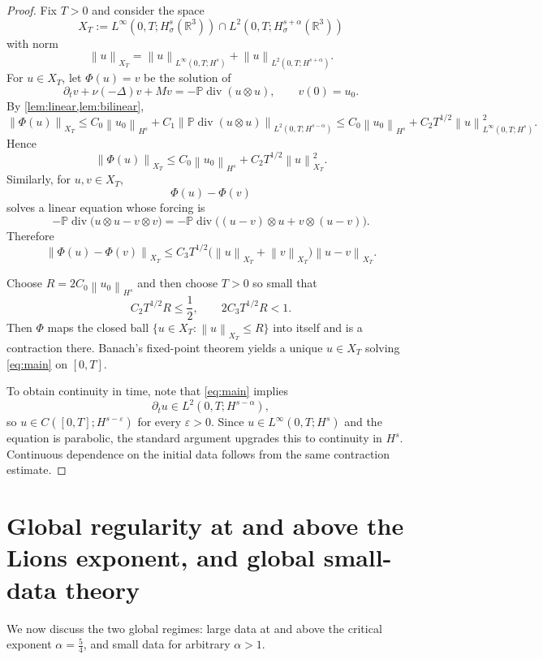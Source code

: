 \documentclass[11pt]{article}
\theoremstyle{definition}
\theoremstyle{remark}
\newcommand{\R}{\mathbb{R}}
\newcommand{\Pcal}{\mathbb{P}}
\newcommand{\norm}[1]{\left\lVert #1\right\rVert}
\newcommand{\diver}{\operatorname{div}}
\begin{document}
\begin{proof}
Fix $T>0$ and consider the space
\[
X_T
:=
L^\infty(0,T;H^s_\sigma(\R^3))
\cap
L^2(0,T;H^{s+\alpha}_\sigma(\R^3))
\]
with norm
\[
\norm{u}_{X_T}
=
\norm{u}_{L^\infty(0,T;H^s)}
+
\norm{u}_{L^2(0,T;H^{s+\alpha})}.
\]
For $u\in X_T$, let $\Phi(u)=v$ be the solution of
\begin{equation}\label{eq:fixedpoint}
\partial_t v + \nu(-\Delta)v + M v = -\Pcal\diver(u\otimes u),
\qquad
v(0)=u_0.
\end{equation}
By \cref{lem:linear,lem:bilinear},
\[
\norm{\Phi(u)}_{X_T}
\le
C_0 \norm{u_0}_{H^s}
+
C_1 \norm{\Pcal\diver(u\otimes u)}_{L^2(0,T;H^{s-\alpha})}
\le
C_0 \norm{u_0}_{H^s}
+
C_2 T^{1/2}\norm{u}_{L^\infty(0,T;H^s)}^2.
\]
Hence
\begin{equation}\label{eq:mapping-est}
\norm{\Phi(u)}_{X_T}
\le
C_0 \norm{u_0}_{H^s}
+
C_2 T^{1/2}\norm{u}_{X_T}^2.
\end{equation}
Similarly, for $u,v\in X_T$,
\[
\Phi(u)-\Phi(v)
\]
solves a linear equation whose forcing is
\[
-\Pcal \diver \bigl( u\otimes u - v\otimes v\bigr)
=
-\Pcal \diver \bigl((u-v)\otimes u + v\otimes (u-v)\bigr).
\]
Therefore
\[
\norm{\Phi(u)-\Phi(v)}_{X_T}
\le
C_3 T^{1/2}\bigl(\norm{u}_{X_T}+\norm{v}_{X_T}\bigr)\norm{u-v}_{X_T}.
\]

Choose $R=2C_0 \norm{u_0}_{H^s}$ and then choose $T>0$ so small that
\[
C_2 T^{1/2} R \le \frac12,
\qquad
2 C_3 T^{1/2}R <1.
\]
Then $\Phi$ maps the closed ball $\{u\in X_T: \norm{u}_{X_T}\le R\}$ into itself and is a contraction there. Banach's fixed-point theorem yields a unique $u\in X_T$ solving \eqref{eq:main} on $[0,T]$.

To obtain continuity in time, note that \eqref{eq:main} implies
\[
\partial_t u \in L^2(0,T;H^{s-\alpha}),
\]
so $u\in C([0,T];H^{s-\varepsilon})$ for every $\varepsilon>0$. Since $u\in L^\infty(0,T;H^s)$ and the equation is parabolic, the standard argument upgrades this to continuity in $H^s$. Continuous dependence on the initial data follows from the same contraction estimate.
\end{proof}

\section{Global regularity at and above the Lions exponent, and global small-data theory}\label{sec:global}

We now discuss the two global regimes: large data at and above the critical exponent $\alpha=\frac54$, and small data for arbitrary $\alpha>1$.
\end{document}
